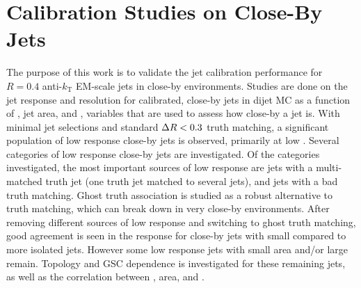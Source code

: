 \clearpage

\section{Calibration Studies on Close-By Jets}

The purpose of this work is to validate the jet calibration performance for $R = 0.4$ anti-$k_\text{T}$ EM-scale jets in close-by environments. Studies are done on the jet response and resolution for calibrated, close-by jets in  dijet MC as a function of \DeltaRmin, jet area, and \fCloseby, variables that are used to assess how close-by a jet is. With minimal jet selections and standard $\Delta R < 0.3$ truth matching, a significant population of low response close-by jets is observed, primarily at low \pt. Several categories of low response close-by jets are investigated. Of the categories investigated, the most important sources of low response are jets with a multi-matched truth jet (one truth jet matched to several jets), and jets with a bad truth matching. Ghost truth association is studied as a robust alternative to \DeltaR truth matching, which can break down in very close-by environments. After removing different sources of low response and switching to ghost truth matching, good agreement is seen in the response for close-by jets with small \DeltaRmin compared to more isolated jets. However some low response jets with small area and/or large \fCloseby remain. Topology and GSC dependence is investigated for these remaining jets, as well as the correlation between \DeltaRmin, area, and \fCloseby.